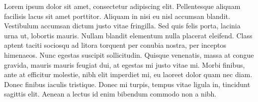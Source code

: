 \documentclass[english]{article}
\begin{document}
Lorem ipsum dolor sit amet, consectetur adipiscing elit. Pellentesque aliquam facilisis lacus sit amet porttitor. Aliquam in nisi eu nisl accumsan blandit. Vestibulum accumsan dictum justo vitae fringilla. Sed quis felis porta, lacinia urna ut, lobortis mauris. Nullam blandit elementum nulla placerat eleifend. Class aptent taciti sociosqu ad litora torquent per conubia nostra, per inceptos himenaeos. Nunc egestas suscipit sollicitudin. Quisque venenatis, massa at congue gravida, mauris mauris feugiat dui, at egestas mi justo vitae mi. Morbi finibus, ante at efficitur molestie, nibh elit imperdiet mi, eu laoreet dolor quam nec diam. Donec finibus iaculis tristique. Donec mi turpis, tempus vitae ligula in, tincidunt sagittis elit. Aenean a lectus id enim bibendum commodo non a nibh.



%

%

%

%

%
\end{document}
